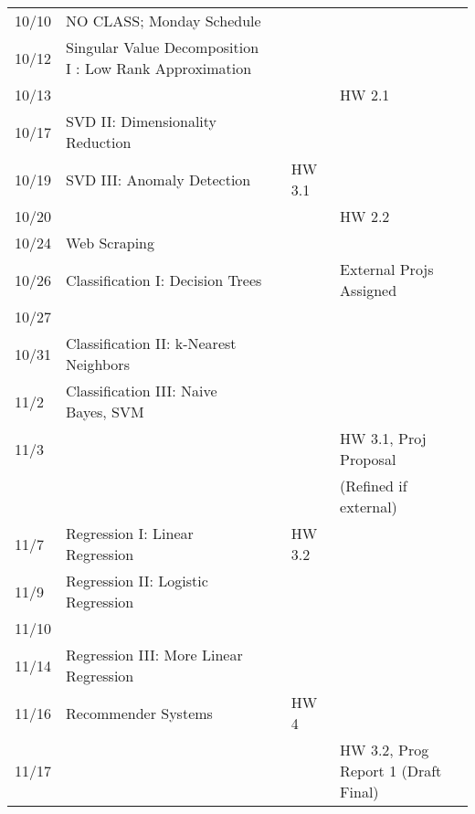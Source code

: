 \documentclass[11pt]{article}
\begin{document}
\begin{centering}
\begin{tabular}{||l|p{3in}|l|l|l||}
10/10 &  NO CLASS; Monday Schedule &  & &  \\   
10/12 & Singular Value Decomposition I : Low Rank Approximation & & & \\
10/13 &&&& HW 2.1 \\
\hline

10/17 & SVD II: Dimensionality Reduction &&&\\
10/19 &SVD III: Anomaly Detection & & HW 3.1 & \\ 
10/20 &&&& HW 2.2 \\

\hline

 10/24 & Web Scraping & &  & \\ 
 10/26 & Classification I: Decision Trees & & & External Projs Assigned\\ 
10/27 &&&& \\
\hline

 10/31 & Classification II: k-Nearest Neighbors & &  &\\ 
11/2 & Classification III: Naive Bayes, SVM & & &\\ 
11/3 &&&& HW 3.1, Proj Proposal\\ &&&& (Refined if external)\\
\hline

11/7 & Regression I: Linear Regression && HW 3.2 &\\ 
11/9 & Regression II: Logistic Regression & & & \\ 
11/10 &&&& \\
\hline

11/14 & Regression III: More Linear Regression & & &\\ 
11/16 & Recommender Systems & & HW 4 & \\
11/17 &&&& HW 3.2, Prog Report 1 (Draft Final)\\
\hline


\end{tabular}
\end{centering}
\end{document}
